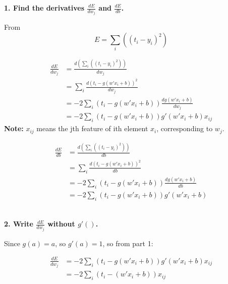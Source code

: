 \begin{description}
\item{\bf \large 1. Find the derivatives $\frac{dE}{dw_j}$ and $\frac{dE}{db}$.}

From
\begin{equation} \label{eq1}
	E = \sum_i{((t_i - y_i)^2)}
\end{equation}

\begin{equation}
\begin{split}
	\frac{dE}{dw_j} & = \frac{d(\sum_i{((t_i - y_i)^2)})}{dw_j} \\
					& = \sum_i{\frac{d(t_i - g(w' x_i + b))^2}{dw_j}} \\
					& = -2\sum_i{(t_i - g(w' x_i + b))\frac{dg(w' x_i + b)}{dw_j}} \\
					& = -2\sum_i{(t_i - g(w' x_i + b))g'(w' x_i + b) x_{ij}}
\end{split}
\end{equation}
{\bf Note: }$x_{ij}$ means the jth feature of ith element $x_i$, corresponding to $w_j$.

\begin{equation}
\begin{split}
	\frac{dE}{db} & = \frac{d(\sum_i{((t_i - y_i)^2)})}{db} \\
				  & = \sum_i{\frac{d(t_i - g(w' x_i + b))^2}{db}} \\
				  & = -2\sum_i{(t_i - g(w' x_i + b))\frac{dg(w' x_i + b)}{db}} \\
				  & = -2\sum_i{(t_i - g(w' x_i + b))g'(w' x_i + b)}
\end{split}
\end{equation}\\

\item{\bf \large 2. Write $\frac{dE}{dw_j}$ without $g'()$.}

Since $g(a) = a$, so $g'(a) = 1$, so from part 1:

\begin{equation}
\begin{split}
	\frac{dE}{dw_j} & = -2\sum_i{(t_i - g(w' x_i + b))g'(w' x_i + b) x_{ij}} \\
					& = -2\sum_i{(t_i - (w' x_i + b)) x_{ij}} \\
\end{split}
\end{equation}\\


\end{description}
